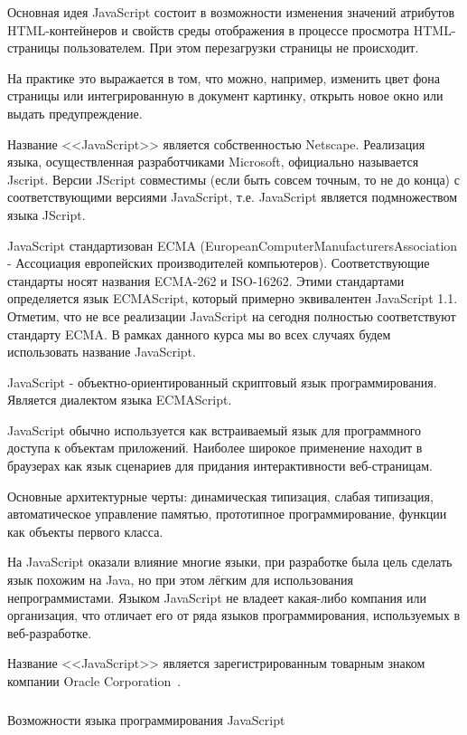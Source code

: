Основная идея JavaScript состоит в возможности изменения значений атрибутов HTML-контейнеров и свойств среды отображения в процессе просмотра HTML-страницы пользователем. При этом перезагрузки страницы не происходит.

На практике это выражается в том, что можно, например, изменить цвет фона страницы или интегрированную в документ картинку, открыть новое окно или выдать предупреждение.

Название <<JavaScript>> является собственностью Netscape. Реализация языка, осуществленная разработчиками Microsoft, официально называется Jscript. Версии JScript совместимы (если быть совсем точным, то не до конца) с соответствующими версиями JavaScript, т.е. JavaScript является подмножеством языка JScript.

JavaScript стандартизован ECMA (European\-Computer\-Manufacturers\-Association - Ассоциация европейских производителей компьютеров). Соответствующие стандарты носят названия ECMA-262 и ISO-16262. Этими стандартами определяется язык ECMAScript, который примерно эквивалентен JavaScript 1.1. Отметим, что не все реализации JavaScript на сегодня полностью соответствуют стандарту ECMA. В рамках данного курса мы во всех случаях будем использовать название JavaScript.

JavaScript - объектно-ориентированный скриптовый язык программирования. Является диалектом языка ECMAScript.

JavaScript обычно используется как встраиваемый язык для программного доступа к объектам приложений. Наиболее широкое применение находит в браузерах как язык сценариев для придания интерактивности веб-страницам.

Основные архитектурные черты: динамическая типизация, слабая типизация, автоматическое управление памятью, прототипное программирование, функции как объекты первого класса.

На JavaScript оказали влияние многие языки, при разработке была цель сделать язык похожим на Java, но при этом лёгким для использования непрограммистами. Языком JavaScript не владеет какая-либо компания или организация, что отличает его от ряда языков программирования, используемых в веб-разработке.

Название <<JavaScript>> является зарегистрированным товарным знаком компании Oracle Corporation~\cite{wiki_js}.

\subsubsection{}Возможности языка программирования JavaScript
\

